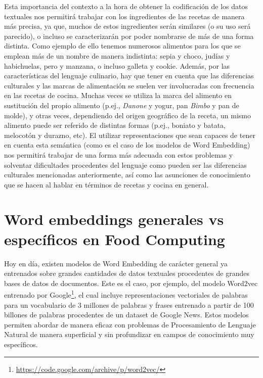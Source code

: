 Esta importancia del contexto a la hora de obtener la codificación de los datos textuales nos permitirá trabajar con los ingredientes de las recetas de manera más precisa, ya que, muchos de estos ingredientes serán similares (o su uso será parecido), o incluso se caracterizarán por poder nombrarse de más de una forma distinta. Como ejemplo de ello tenemos numerosos alimentos para los que se emplean más de un nombre de manera indistinta: sepia y choco, judías y habichuelas, pero y manzana, o incluso galleta y cookie. Además, por las características del lenguaje culinario, hay que tener en cuenta que las diferencias culturales y las marcas de alimentación se suelen ver involucradas con frecuencia en las recetas de cocina. Muchas veces se utiliza la marca del alimento en sustitución del propio alimento (p.ej., \textit{Danone} y yogur, pan \textit{Bimbo} y pan de molde), y otras veces, dependiendo del origen geográfico de la receta, un mismo alimento puede ser referido de distintas formas (p.ej., boniato y batata, melocotón y durazno, etc). El utilizar representaciones que sean capaces de tener en cuenta esta semántica (como es el caso de los modelos de Word Embedding) nos permitirá trabajar de una forma más adecuada con estos problemas y solventar dificultades procedentes del lenguaje como pueden ser las diferencias culturales mencionadas anteriormente, así como las asunciones de conocimiento que se hacen al hablar en términos de recetas y cocina en general. 
 
\section[Word embeddings generales vs específicos]{Word embeddings generales vs específicos en Food Computing}

Hoy en día, existen modelos de Word Embedding de carácter general ya entrenados sobre grandes cantidades de datos textuales procedentes de grandes bases de datos de documentos. Este es el caso, por ejemplo, del modelo Word2vec entrenado por Google\footnote{\url{https://code.google.com/archive/p/word2vec/}}, el cual incluye representaciones vectoriales de palabras para un vocabulario de 3 millones de palabras y frases entrenado a partir de 100 billones de palabras procedentes de un dataset de Google News. Estos modelos permiten abordar de manera eficaz con problemas de Procesamiento de Lenguaje Natural de manera superficial y sin profundizar en campos de conocimiento muy específicos. 


